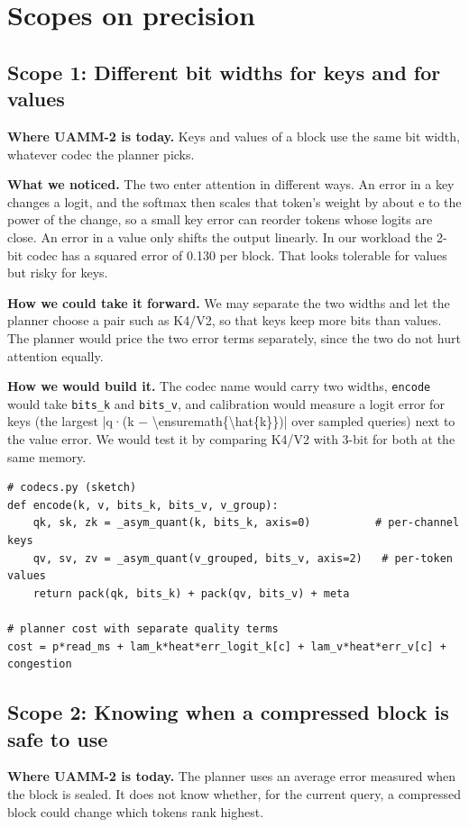 \documentclass[12pt,a4paper]{report}
\begin{document}
\section{Scopes on precision}
\subsection{Scope 1: Different bit widths for keys and for values}
\textbf{Where UAMM-2 is today.} Keys and values of a block use the same bit width, whatever codec the planner picks.

\textbf{What we noticed.} The two enter attention in different ways. An error in a key changes a logit, and the softmax then scales that token's weight by about e to the power of the change, so a small key error can reorder tokens whose logits are close. An error in a value only shifts the output linearly. In our workload the 2-bit codec has a squared error of 0.130 per block. That looks tolerable for values but risky for keys.

\textbf{How we could take it forward.} We may separate the two widths and let the planner choose a pair such as K4/V2, so that keys keep more bits than values. The planner would price the two error terms separately, since the two do not hurt attention equally.

\textbf{How we would build it.} The codec name would carry two widths, \texttt{encode} would take \texttt{bits\_\allowbreak{}\allowbreak{}k} and \texttt{bits\_\allowbreak{}\allowbreak{}v}, and calibration would measure a logit error for keys (the largest |q·(k − \textbackslash{}ensuremath\{\textbackslash{}hat\{k\}\})| over sampled queries) next to the value error. We would test it by comparing K4/V2 with 3-bit for both at the same memory.

\begin{lstlisting}
# codecs.py (sketch)
def encode(k, v, bits_k, bits_v, v_group):
    qk, sk, zk = _asym_quant(k, bits_k, axis=0)          # per-channel keys
    qv, sv, zv = _asym_quant(v_grouped, bits_v, axis=2)   # per-token values
    return pack(qk, bits_k) + pack(qv, bits_v) + meta

# planner cost with separate quality terms
cost = p*read_ms + lam_k*heat*err_logit_k[c] + lam_v*heat*err_v[c] + congestion
\end{lstlisting}
\subsection{Scope 2: Knowing when a compressed block is safe to use}
\textbf{Where UAMM-2 is today.} The planner uses an average error measured when the block is sealed. It does not know whether, for the current query, a compressed block could change which tokens rank highest.
\end{document}
